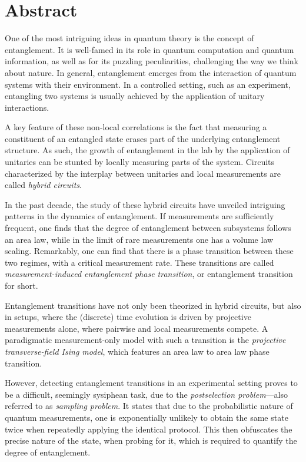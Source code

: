 \chapter{Abstract}

One of the most intriguing ideas in quantum theory is the concept of
entanglement. It is well-famed in its role in quantum computation and quantum
information, as well as for its puzzling peculiarities, challenging the way we
think about nature. In general, entanglement emerges from the interaction of
quantum systems with their environment. In a controlled setting, such as an
experiment, entangling two systems is usually achieved by the application of
unitary interactions.

A key feature of these non-local correlations is the fact that measuring a
constituent of an entangled state erases part of the underlying entanglement
structure. As such, the growth of entanglement in the lab by the application of
unitaries can be stunted by locally measuring parts of the system. Circuits
characterized by the interplay between unitaries and local measurements are
called \emph{hybrid circuits}.

In the past decade, the study of these hybrid circuits have unveiled intriguing
patterns in the dynamics of entanglement. If measurements are sufficiently
frequent, one finds that the degree of entanglement between subsystems follows
an area law, while in the limit of rare measurements one has a volume law
scaling. Remarkably, one can find that there is a phase transition between
these two regimes, with a critical measurement rate. These transitions are
called \emph{measurement-induced entanglement phase transition}, or
entanglement transition for short.

Entanglement transitions have not only been theorized in hybrid circuits, but also in
setups, where the (discrete) time evolution is driven by projective measurements alone,
where pairwise and local measurements compete. A paradigmatic measurement-only
model with such a transition is the \emph{projective transverse-field Ising
model}, which features an area law to area law phase transition.

However, detecting entanglement transitions in an experimental setting proves
to be a difficult, seemingly sysiphean task, due to the \emph{postselection
problem}---also referred to as \emph{sampling problem}. It
states that due to the probabilistic nature of quantum measurements, one is
exponentially unlikely to obtain the same state twice when repeatedly applying
the identical protocol. This then obfuscates the precise nature of the state,
when probing for it, which is required to quantify the degree of entanglement.

